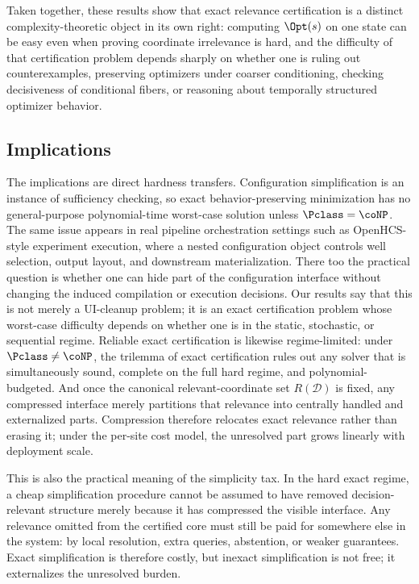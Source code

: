Taken together, these results show that exact relevance certification is a distinct complexity-theoretic object in its own right: computing $\Opt(s)$ on one state can be easy even when proving coordinate irrelevance is hard, and the difficulty of that certification problem depends sharply on whether one is ruling out counterexamples, preserving optimizers under coarser conditioning, checking decisiveness of conditional fibers, or reasoning about temporally structured optimizer behavior.

\subsection*{Implications}

The implications are direct hardness transfers. Configuration simplification is an instance of sufficiency checking, so exact behavior-preserving minimization has no general-purpose polynomial-time worst-case solution unless $\Pclass=\coNP$. The same issue appears in real pipeline orchestration settings such as OpenHCS-style experiment execution, where a nested configuration object controls well selection, output layout, and downstream materialization. There too the practical question is whether one can hide part of the configuration interface without changing the induced compilation or execution decisions. Our results say that this is not merely a UI-cleanup problem; it is an exact certification problem whose worst-case difficulty depends on whether one is in the static, stochastic, or sequential regime. Reliable exact certification is likewise regime-limited: under $\Pclass\neq\coNP$, the trilemma of exact certification rules out any solver that is simultaneously sound, complete on the full hard regime, and polynomial-budgeted. And once the canonical relevant-coordinate set $R(\mathcal{D})$ is fixed, any compressed interface merely partitions that relevance into centrally handled and externalized parts. Compression therefore relocates exact relevance rather than erasing it; under the per-site cost model, the unresolved part grows linearly with deployment scale.

This is also the practical meaning of the simplicity tax. In the hard exact regime, a cheap simplification procedure cannot be assumed to have removed decision-relevant structure merely because it has compressed the visible interface. Any relevance omitted from the certified core must still be paid for somewhere else in the system: by local resolution, extra queries, abstention, or weaker guarantees. Exact simplification is therefore costly, but inexact simplification is not free; it externalizes the unresolved burden.

